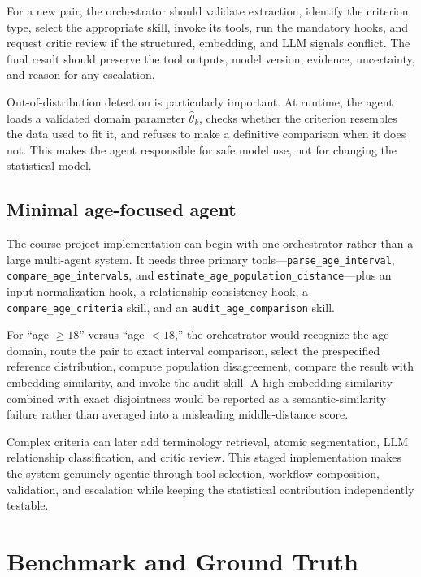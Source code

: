 \documentclass[11pt]{article}
\begin{document}
For a new pair, the orchestrator should validate extraction, identify the criterion type, select the appropriate skill, invoke its tools, run the mandatory hooks, and request critic review if the structured, embedding, and LLM signals conflict. The final result should preserve the tool outputs, model version, evidence, uncertainty, and reason for any escalation.

Out-of-distribution detection is particularly important. At runtime, the agent loads a validated domain parameter $\widehat\theta_k$, checks whether the criterion resembles the data used to fit it, and refuses to make a definitive comparison when it does not. This makes the agent responsible for safe model use, not for changing the statistical model.

\subsection{Minimal age-focused agent}

The course-project implementation can begin with one orchestrator rather than a large multi-agent system. It needs three primary tools---\texttt{parse\_age\_interval}, \texttt{compare\_age\_intervals}, and \texttt{estimate\_age\_population\_distance}---plus an input-normalization hook, a relationship-consistency hook, a \texttt{compare\_age\_criteria} skill, and an \texttt{audit\_age\_comparison} skill.

For ``age $\geq18$'' versus ``age $<18$,'' the orchestrator would recognize the age domain, route the pair to exact interval comparison, select the prespecified reference distribution, compute population disagreement, compare the result with embedding similarity, and invoke the audit skill. A high embedding similarity combined with exact disjointness would be reported as a semantic-similarity failure rather than averaged into a misleading middle-distance score.

Complex criteria can later add terminology retrieval, atomic segmentation, LLM relationship classification, and critic review. This staged implementation makes the system genuinely agentic through tool selection, workflow composition, validation, and escalation while keeping the statistical contribution independently testable.

\section{Benchmark and Ground Truth}
\end{document}
